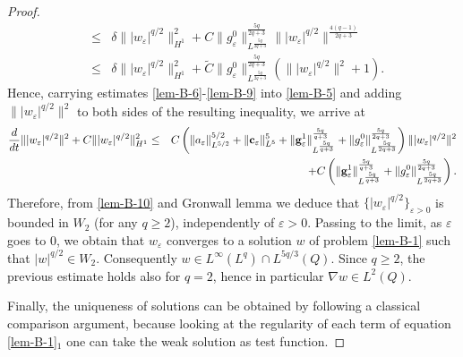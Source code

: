\documentclass[11pt,reqno]{amsart}%
\numberwithin{equation}{section}
\begin{document}
{\begin{proof}
\begin{eqnarray}
&\le&\delta\||w_\varepsilon|^{q/2}\|^2_{H^1}+C\|g^0_\varepsilon\|_{L^{\frac{5q}{2q+3}}}^{\frac{5q}{2q+3}}\||w_\varepsilon|^{q/2}\|^{\frac{4(q-1)}{2q+3}}\nonumber \\
&\le&
\delta\||w_\varepsilon|^{q/2}\|^2_{H^1}
+
\tilde{C}
\|g^0_\varepsilon\|_{L^{\frac{5q}{2q+3}}}^{\frac{5q}{2q+3}}
\left(\||w_\varepsilon|^{q/2}\|^2 + 1 \right)
.\label{lem-B-9}
\end{eqnarray}
Hence, carrying estimates \eqref{lem-B-6}-\eqref{lem-B-9} into \eqref{lem-B-5} and adding $\||w_\varepsilon|^{q/2}\|^2$ to both sides of the resulting inequality, we arrive at 
\begin{eqnarray}
\frac{d}{dt}\||w_\varepsilon|^{q/2}\|^2+C\||w_\varepsilon|^{q/2}\|^2_{H^1}
&\le&C\left(\|a_{\varepsilon}\|^{5/2}_{L^{5/2}}+\|{\bf c}_\varepsilon\|_{L^5}^5
+
\|{\bf g}_\varepsilon^1\|_{L^{\frac{5q}{q+3}}}^{\frac{5q}{q+3}}+\|g^0_\varepsilon\|_{L^{\frac{5q}{2q+3}}}^{\frac{5q}{2q+3}}
\right)\||w_\varepsilon|^{q/2}\|^2
\nonumber\\
&&+C\left(\|{\bf g}_\varepsilon^1\|_{L^{\frac{5q}{q+3}}}^{\frac{5q}{q+3}}+\|g^0_\varepsilon\|_{L^{\frac{5q}{2q+3}}}^{\frac{5q}{2q+3}}\right).\label{lem-B-10}
\end{eqnarray}
Therefore, from \eqref{lem-B-10} and Gronwall lemma we deduce that 
$\{|w_\varepsilon|^{q/2}\}_{\varepsilon>0}$ is bounded in $W_2$ (for any $q\ge 2$), independently of $\varepsilon>0$. 
Passing to the limit, as $\varepsilon$ goes to 0, we obtain that $w_\varepsilon$ converges to a solution $w$ of problem \eqref{lem-B-1} such that $|w|^{q/2}\in W_2$. Consequently $w\in L^\infty(L^q)\cap L^{5q/3}(Q)$. Since $q\ge 2$, the previous estimate holds also for $q=2$, hence in particular $\nabla w\in L^2(Q)$.
%

Finally, the uniqueness of solutions can be obtained by following a classical comparison argument, because looking at the regularity of each term of equation \eqref{lem-B-1}$_1$ one can take the weak solution as test function.
 \end{proof}
 
}
\end{document}
